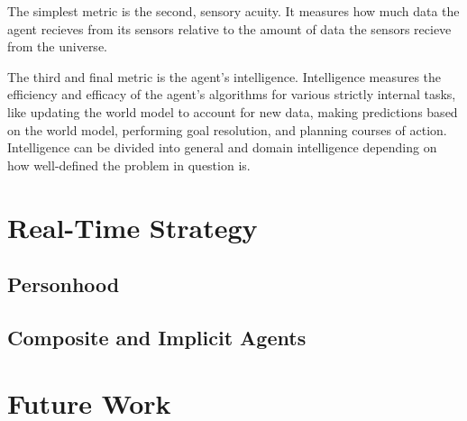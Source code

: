 \documentclass[12pt]{article}
\theoremstyle{definition}
\begin{document}
The simplest metric is the second, sensory acuity. It measures how much data the
agent recieves from its sensors relative to the amount of data the sensors
recieve from the universe.

The third and final metric is the agent's intelligence. Intelligence measures
the efficiency and efficacy of the agent's algorithms for various strictly
internal tasks, like updating the world model to account for new data, making
predictions based on the world model, performing goal resolution, and planning
courses of action. Intelligence can be divided into general and domain
intelligence depending on how well-defined the problem in question is.


\section{Real-Time Strategy}
\label{sec:games}


\subsection{Personhood}
\label{sec:persons}


\subsection{Composite and Implicit Agents}
\label{sec:composites}




\section{Future Work}
\label{sec:future}



\end{document}
